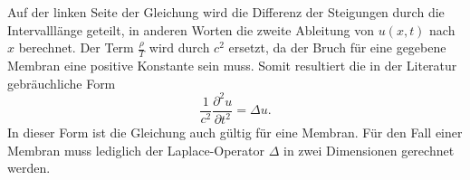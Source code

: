 Auf der linken Seite der Gleichung wird die Differenz der Steigungen durch die Intervalllänge geteilt, in anderen Worten die zweite Ableitung von $ u(x,t) $ nach $ x $ berechnet. 
Der Term $ \frac{\rho}{T} $ wird durch $ c^2 $ ersetzt, da der Bruch für eine gegebene Membran eine positive Konstante sein muss. 
Somit resultiert die in der Literatur gebräuchliche Form 
\begin{equation}
	\label{kreismembran:Ausgang_DGL}
	\frac{1}{c^2}\frac{\partial^2u}{\partial t^2} = \Delta u.
\end{equation}
In dieser Form ist die Gleichung auch gültig für eine Membran. 
Für den Fall einer Membran muss lediglich der Laplace-Operator $\Delta$ in zwei Dimensionen gerechnet werden.